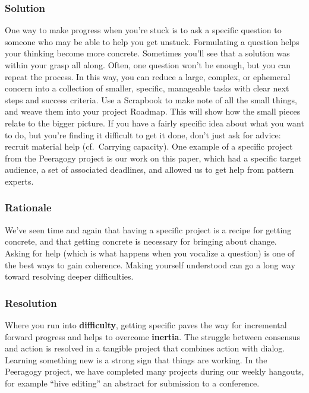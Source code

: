 \hypertarget{solution}{%
\subsubsection{Solution}\label{solution}}

One way to make progress when you're stuck is to ask a specific question
to someone who may be able to help you get unstuck. Formulating a
question helps your thinking become more concrete. Sometimes you'll see
that a solution was within your grasp all along. Often, one question
won't be enough, but you can repeat the process. In this way, you can
reduce a large, complex, or ephemeral concern into a collection of
smaller, specific, manageable tasks with clear next steps and success
criteria. Use a {{Scrapbook}} to make note of all the small things, and
weave them into your project {{Roadmap}}. This will show how the small
pieces relate to the bigger picture. If you have a fairly specific idea
about what you want to do, but you're finding it difficult to get it
done, don't just ask for advice: recruit material help (cf.~{{Carrying
capacity}}). One example of a specific project from the Peeragogy
project is our work on this paper, which had a specific target audience,
a set of associated deadlines, and allowed us to get help from pattern
experts.

\hypertarget{rationale}{%
\subsubsection{Rationale}\label{rationale}}

We've seen time and again that having a specific project is a recipe for
getting concrete, and that getting concrete is necessary for bringing
about change. Asking for help (which is what happens when you vocalize a
question) is one of the best ways to gain coherence. Making yourself
understood can go a long way toward resolving deeper difficulties.

\hypertarget{resolution}{%
\subsubsection{Resolution}\label{resolution}}

Where you run into \textbf{difficulty}, getting specific paves the way
for incremental forward progress and helps to overcome \textbf{inertia}.
The struggle between consensus and action is resolved in a tangible
project that combines action with dialog. Learning something new is a
strong sign that things are working. In the Peeragogy project, we have
completed many projects during our weekly hangouts, for example ``hive
editing'' an abstract for submission to a conference.

